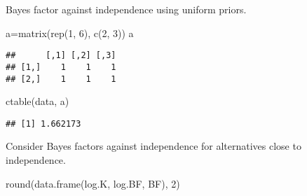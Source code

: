 \documentclass[
]{book}
\newenvironment{Shaded}{\begin{snugshade}}{\end{snugshade}}
\newcommand{\ControlFlowTok}[1]{\textcolor[rgb]{0.13,0.29,0.53}{\textbf{#1}}}
\newcommand{\DecValTok}[1]{\textcolor[rgb]{0.00,0.00,0.81}{#1}}
\newcommand{\FunctionTok}[1]{\textcolor[rgb]{0.00,0.00,0.00}{#1}}
\newcommand{\NormalTok}[1]{#1}
\newcommand{\OtherTok}[1]{\textcolor[rgb]{0.56,0.35,0.01}{#1}}
\newcommand{\SpecialCharTok}[1]{\textcolor[rgb]{0.00,0.00,0.00}{#1}}
\begin{document}
Bayes factor against independence using uniform priors.

\begin{Shaded}
\begin{Highlighting}[]
\NormalTok{a}\OtherTok{=}\FunctionTok{matrix}\NormalTok{(}\FunctionTok{rep}\NormalTok{(}\DecValTok{1}\NormalTok{, }\DecValTok{6}\NormalTok{), }\FunctionTok{c}\NormalTok{(}\DecValTok{2}\NormalTok{, }\DecValTok{3}\NormalTok{))}
\NormalTok{a}
\end{Highlighting}
\end{Shaded}

\begin{verbatim}
##      [,1] [,2] [,3]
## [1,]    1    1    1
## [2,]    1    1    1
\end{verbatim}

\begin{Shaded}
\begin{Highlighting}[]
\FunctionTok{ctable}\NormalTok{(data, a)}
\end{Highlighting}
\end{Shaded}

\begin{verbatim}
## [1] 1.662173
\end{verbatim}

Consider Bayes factors against independence for alternatives close to independence.

\begin{Shaded}
\end{Shaded}

\begin{Shaded}
\begin{Highlighting}[]
\FunctionTok{round}\NormalTok{(}\FunctionTok{data.frame}\NormalTok{(log.K, log.BF, BF), }\DecValTok{2}\NormalTok{)}
\end{Highlighting}
\end{Shaded}
\end{document}

